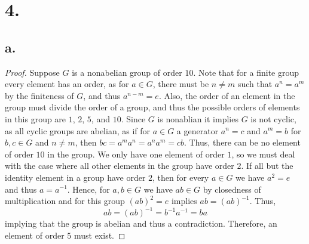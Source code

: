 \documentclass{article}
\begin{document}
\section*{4.}
\subsection*{a.}
\begin{proof}
    Suppose $G$ is a nonabelian group of order $10$. Note that for a finite group every element has an order, as for $a \in G$, there must be $n \neq m$ such that $a^n = a^m$ by the finiteness of $G$, and thus $a^{n - m} = e$. Also, the order of an element in the group must divide the order of a group, and thus the possible orders of elements in this group are $1$, $2$, $5$, and $10$. Since $G$ is nonablian it implies $G$ is not cyclic, as all cyclic groups are abelian, as if for $a \in G$ a generator $a^n = c$ and $a^m= b$ for $b, c \in G$ and $n \neq m$, then $bc = a^ma^n = a^na^m = cb$. Thus, there can be no element of order $10$ in the group. We only have one element of order $1$, so we must deal with the case where all other elements in the group have order $2$. If all but the identity element in a group have order $2$, then for every $a \in G$ we have $a^2 = e$ and thus $a = a^{-1}$. Hence, for $a, b \in G$ we have $ab \in G$ by closedness of multiplication and for this group $(ab)^2 = e$ implies $ab = (ab)^{-1}$. Thus, 
    \[
    ab = (ab)^{-1} = b^{-1}a^{-1} = ba    
    \]
    implying that the group is abelian and thus a contradiction. Therefore, an element of order $5$ must exist. 
\end{proof}
\end{document}
